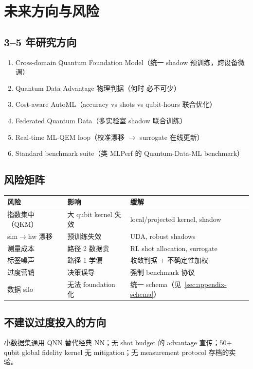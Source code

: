 \section{未来方向与风险}
\label{sec:future-risks}

\subsection{3--5 年研究方向}

\begin{enumerate}[leftmargin=*]
  \item Cross-domain Quantum Foundation Model（统一 shadow 预训练，跨设备微调）
  \item Quantum Data Advantage 物理判据（何时 \pathtwo{} 必不可少）
  \item Cost-aware AutoML（accuracy vs shots vs qubit-hours 联合优化）
  \item Federated Quantum Data（多实验室 shadow 联合训练）~\cite{QFLSurvey2025}
  \item Real-time ML-QEM loop（校准漂移 $\rightarrow$ surrogate 在线更新）
  \item Standard benchmark suite（类 MLPerf 的 Quantum-Data-ML benchmark）
\end{enumerate}

\subsection{风险矩阵}

\begin{table}[htbp]
  \centering
  \small
  \begin{tabular}{@{}llp{5.5cm}@{}}
    \toprule
    风险 & 影响 & 缓解 \\
    \midrule
    指数集中（QKM） & 大 qubit kernel 失效 & local/projected kernel, shadow \\
    sim$\rightarrow$hw 漂移 & 预训练失效 & UDA, robust shadows \\
    测量成本 & 路径 2 数据贵 & RL shot allocation, surrogate \\
    标签噪声 & 路径 1 学偏 & 收敛判据 + 不确定性加权 \\
    过度营销 & 决策误导 & 强制 benchmark 协议 \\
    数据 silo & 无法 foundation 化 & 统一 schema（见~\ref{sec:appendix-schema}） \\
    \bottomrule
  \end{tabular}
\end{table}

\subsection{不建议过度投入的方向}

小数据集通用 QNN 替代经典 NN；无 shot budget 的 advantage 宣传；50+ qubit global fidelity kernel 无 mitigation；无 measurement protocol 存档的实验。
